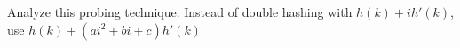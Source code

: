 Analyze this probing technique.
Instead of double hashing with $h(k) + ih'(k)$,
use $h(k) + (ai^2 + bi + c)h'(k)$

